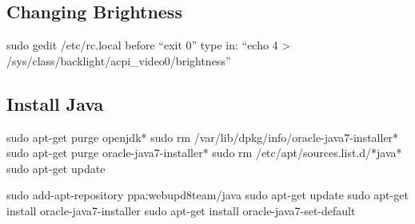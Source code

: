 \documentclass[a4paper, 12pt]{article}
\begin{document}
\subsection{Changing Brightness}
sudo gedit /etc/rc.local
before ``exit 0'' type in: ``echo 4 > /sys/class/backlight/acpi\_video0/brightness''
\subsection{Install Java}
sudo apt-get purge openjdk*
sudo rm /var/lib/dpkg/info/oracle-java7-installer*
sudo apt-get purge oracle-java7-installer*
sudo rm /etc/apt/sources.list.d/*java*
sudo apt-get update
 
sudo add-apt-repository ppa:webupd8team/java
sudo apt-get update
sudo apt-get install oracle-java7-installer
sudo apt-get install oracle-java7-set-default
\end{document}
